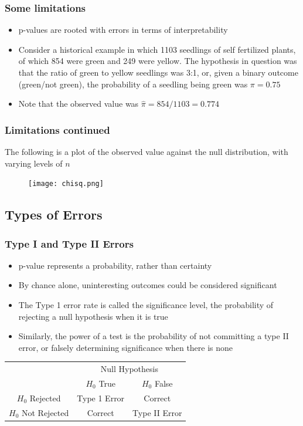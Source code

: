 \documentclass[11pt]{beamer}
\begin{document}
\begin{frame}
\frametitle{Some limitations}
\begin{itemize}
\item p-values are rooted with errors in terms of interpretability \\
\item Consider a historical example in which 1103 seedlings of self fertilized plants, of which 854 were green and 249 were yellow. The hypothesis in question was that the ratio of green to yellow seedlings was 3:1, or, given a binary outcome (green/not green), the probability of a seedling being green was $\pi = 0.75$
\item Note that the observed value was $\hat{\pi} = 854/1103 = 0.774$
\end{itemize}
\end{frame}

\begin{frame}
\frametitle{Limitations continued}
{
The following is a plot of the observed value against the null distribution, with varying levels of $n$

\begin{figure}
\texttt{[image: chisq.png]} \\
\end{figure}
}
\end{frame}

\subsection{Types of Errors}

\begin{frame}
\frametitle{Type I and Type II Errors}

\begin{itemize}
\item p-value represents a probability, rather than certainty \\
\item By chance alone, uninteresting outcomes could be considered significant \\
\item The Type 1 error rate is called the significance level, the probability of rejecting a null hypothesis when it is true \\
\item Similarly, the power of a test is the probability of not committing a type II error, or falsely determining significance when there is none
\end{itemize}

\begin{center}
\begin{tabular}{c| c c }
\hline
& \multicolumn{2}{c}{Null Hypothesis} \\[3pt]
& $H_0$ True & $H_0$ False \\
\hline 
$H_0$ Rejected & Type 1 Error & Correct  \\[2pt]
$H_0$ Not Rejected & Correct & Type II Error \\[1pt]
\hline
\end{tabular}
\end{center}
\end{frame}
\end{document}
